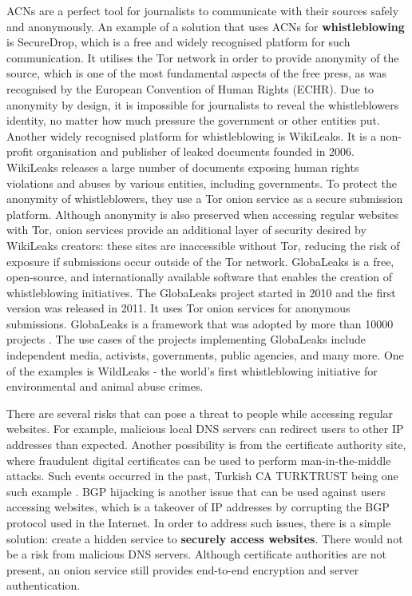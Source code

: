 ACNs are a perfect tool for journalists to communicate with their sources safely and anonymously. An example of a solution that uses ACNs for \textbf{whistleblowing} is SecureDrop, which is a free and widely recognised platform for such communication. It utilises the Tor network in order to provide anonymity of the source, which is one of the most fundamental aspects of the free press, as was recognised by the European Convention of Human Rights (ECHR). Due to anonymity by design, it is impossible for journalists to reveal the whistleblowers identity, no matter how much pressure the government or other entities put.
Another widely recognised platform for whistleblowing is WikiLeaks. It is a non-profit organisation and publisher of leaked documents founded in 2006. WikiLeaks releases a large number of documents exposing human rights violations and abuses by various entities, including governments. To protect the anonymity of whistleblowers, they use a Tor onion service as a secure submission platform. Although anonymity is also preserved when accessing regular websites with Tor, onion services provide an additional layer of security desired by WikiLeaks creators: these sites are inaccessible without Tor, reducing the risk of exposure if submissions occur outside of the Tor network.
GlobaLeaks is a free, open-source, and internationally available software that enables the creation of whistleblowing initiatives. The GlobaLeaks project started in 2010 and the first version was released in 2011. It uses Tor onion services for anonymous submissions. GlobaLeaks is a framework that was adopted by more than 10000 projects \cite{globaleaks}. The use cases of the projects implementing GlobaLeaks include independent media, activists, governments, public agencies, and many more. One of the examples is WildLeaks \cite{wildleaks} - the world’s first whistleblowing initiative for environmental and animal abuse crimes.

There are several risks that can pose a threat to people while accessing regular websites. For example, malicious local DNS servers can redirect users to other IP addresses than expected. Another possibility is from the certificate authority site, where fraudulent digital certificates can be used to perform man-in-the-middle attacks. Such events occurred in the past, Turkish CA TURKTRUST being one such example \cite{turkish-ca}. BGP hijacking is another issue that can be used against users accessing websites, which is a takeover of IP addresses by corrupting the BGP protocol used in the Internet. 
In order to address such issues, there is a simple solution: create a hidden service to \textbf{securely access websites}. There would not be a risk from malicious DNS servers. Although certificate authorities are not present, an onion service still provides end-to-end encryption and server authentication.

